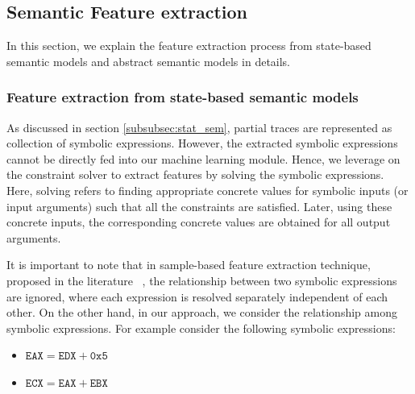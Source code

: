 
\subsection{Semantic Feature extraction } \label{subsec:sem_fea_ext}
In this section, we explain the feature extraction process from state-based semantic models and abstract semantic models in details.

\subsubsection{Feature extraction from state-based semantic models} \label{subsubsec:sb_sem_mod_fe}
As discussed in section \ref{subsubsec:stat_sem}, partial traces are represented as collection of symbolic expressions. However, the extracted symbolic expressions cannot be directly fed into our machine learning module. Hence, we leverage on the constraint solver to extract features by solving the symbolic expressions. Here, solving refers to finding appropriate concrete values for symbolic inputs (or input arguments) such that all the constraints are satisfied. Later, using these concrete inputs, the corresponding concrete values are obtained for all output arguments.

It is important to note that in sample-based feature extraction technique, proposed in the literature ~\cite{pewnycross}, the relationship between two symbolic expressions are ignored, where each expression is resolved separately independent of each other. On the    other hand, in our approach, we consider the relationship among symbolic expressions. For example consider the following symbolic expressions:
\begin{itemize}
\centering
\itemsep0em 
  \item[] $\mathtt{EAX = EDX + 0x5}$
  \item[] $\mathtt{ECX = EAX + EBX}$
\end{itemize}


